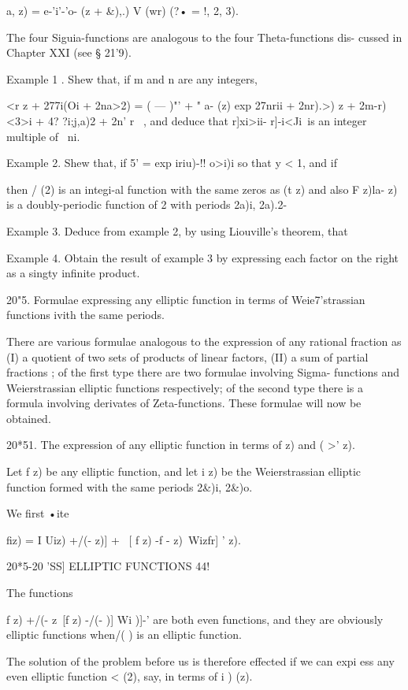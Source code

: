 {a, z) = e-'i'-'o- (z + \&),.) V (wr) (?• = !, 2, 3).

The four Siguia-functions are analogous to the four Theta-functions
dis- cussed in Chapter XXI (see § 21'9).

Example 1 . Shew that, if m and n are any integers,

<r z + 277i(Oi + 2na>2) = ( — )"' + " a- (z) exp 27nrii + 2nr).>) z +
2m-r) <3>i + 4? ?i;j,a)2 + 2n' r\ < ia> , and deduce that r]xi>ii-
r]-i<Ji\ is an integer multiple of \ ni.

Example 2. Shew that, if 5' = exp iriu)-!! o>i)i so that y < 1, and if

then / (2) is an integi-al function with the same zeros as (t z) and
also F z)la- z) is a doubly-periodic function of 2 with periods 2a)i,
2a).2-

Example 3. Deduce from example 2, by using Liouville's theorem, that

Example 4. Obtain the result of example 3 by expressing each factor on
the right as a singty infinite product.

20"5. Formulae expressing any elliptic function in terms of
Weie7'strassian functions ivith the same periods.

There are various formulae analogous to the expression of any rational
fraction as (I) a quotient of two sets of products of linear factors,
(II) a sum of partial fractions ; of the first type there are two
formulae involving Sigma- functions and Weierstrassian elliptic
functions respectively; of the second type there is a formula
involving derivates of Zeta-functions. These formulae will now be
obtained.

20*51. The expression of any elliptic function in terms of z) and ( >'
z).

Let f z) be any elliptic function, and let i z) be the Weierstrassian
elliptic function formed with the same periods 2\&)i, 2\&)o.

We first •ite

fiz) = I Uiz) +/(- z)] + \ [ f z) -f - z)\ Wizfr] ' z).

20*5-20 'SS] ELLIPTIC FUNCTIONS 44!

The functions

f z) +/(- z\ [f z) -/(- )] Wi )]-' are both even functions, and they
are obviously elliptic functions when/( ) is an elliptic function.

The solution of the problem before us is therefore effected if we can
expi ess any even elliptic function < (2), say, in terms of i ) (z).

}

